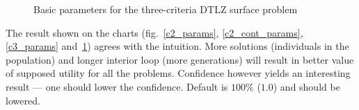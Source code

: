\begin{figure}
  \centering
  \caption{Basic parameters for the three-criteria DTLZ surface problem}
  \label{c3_surface_params}
\end{figure}

The result shown on the charts (fig.~\ref{c2_params}, \ref{c2_cont_params},
\ref{c3_params} and~\ref{c3_surface_params}) agrees with the intuition. More
solutions (individuals in the population) and longer interior loop (more
generations) will result in better value of supposed utility for all the
problems. Confidence however yields an interesting result --- one should lower
the confidence. Default is $100\%$ ($1.0$)  and should be lowered.

